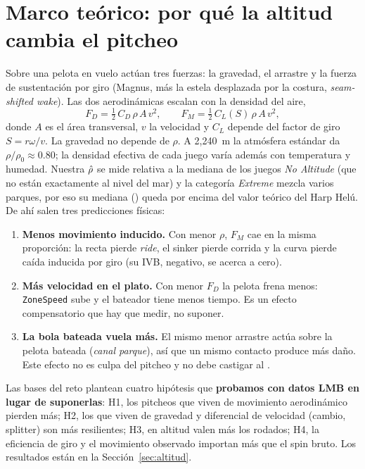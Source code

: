 \documentclass[10pt]{article}
\begin{document}
\section{Marco teórico: por qué la altitud cambia el pitcheo}
\label{sec:teoria}

Sobre una pelota en vuelo actúan tres fuerzas: la gravedad, el arrastre y la fuerza de sustentación por giro (Magnus, más la estela desplazada por la costura, \emph{seam-shifted wake}). Las dos aerodinámicas escalan con la densidad del aire,
\[
F_D = \tfrac12\, C_D\, \rho\, A\, v^2, \qquad F_M = \tfrac12\, C_L(S)\, \rho\, A\, v^2,
\]
donde $A$ es el área transversal, $v$ la velocidad y $C_L$ depende del factor de giro $S = r\omega/v$. La gravedad no depende de $\rho$. A 2{,}240~m la atmósfera estándar da $\rho/\rho_0 \approx 0.80$; la densidad efectiva de cada juego varía además con temperatura y humedad. Nuestra $\hat{\rho}$ se mide relativa a la mediana de los juegos \emph{No Altitude} (que no están exactamente al nivel del mar) y la categoría \emph{Extreme} mezcla varios parques, por eso su mediana () queda por encima del valor teórico del Harp Helú. De ahí salen tres predicciones físicas:

\begin{enumerate}
  \item \textbf{Menos movimiento inducido.} Con menor $\rho$, $F_M$ cae en la misma proporción: la recta pierde \emph{ride}, el sinker pierde corrida y la curva pierde caída inducida por giro (su IVB, negativo, se acerca a cero).
  \item \textbf{Más velocidad en el plato.} Con menor $F_D$ la pelota frena menos: \texttt{ZoneSpeed} sube y el bateador tiene menos tiempo. Es un efecto compensatorio que hay que medir, no suponer.
  \item \textbf{La bola bateada vuela más.} El mismo menor arrastre actúa sobre la pelota bateada (\emph{canal parque}), así que un mismo contacto produce más daño. Este efecto no es culpa del pitcheo y no debe castigar al \splus.
\end{enumerate}

Las bases del reto plantean cuatro hipótesis que \textbf{probamos con datos LMB en lugar de suponerlas}: H1, los pitcheos que viven de movimiento aerodinámico pierden más; H2, los que viven de gravedad y diferencial de velocidad (cambio, splitter) son más resilientes; H3, en altitud valen más los rodados; H4, la eficiencia de giro y el movimiento observado importan más que el spin bruto. Los resultados están en la Sección~\ref{sec:altitud}.
\end{document}
